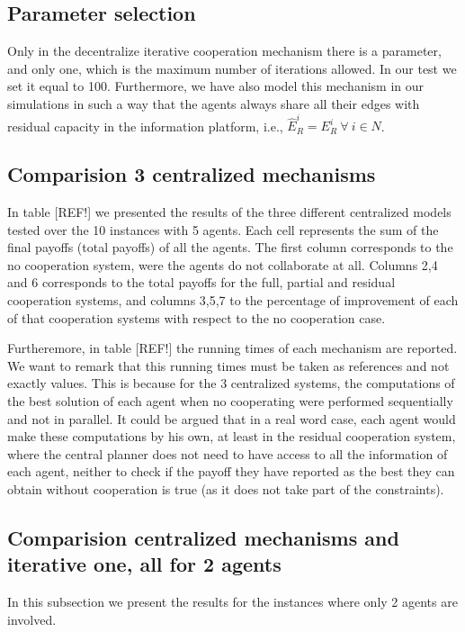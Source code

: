 \documentclass[review]{elsarticle}
\begin{document}
\subsection{Parameter selection}

Only in the decentralize iterative cooperation mechanism there is a parameter, and only one, which is the maximum number of iterations allowed. In our test we set it equal to 100. Furthermore, we have also model this mechanism in our simulations in such a way that the agents always share all their edges with residual capacity in the information platform, i.e., $\widehat{E}_R^i=E_R^i\ \forall\ i\in N$.

\subsection{Comparision 3 centralized mechanisms}

In table [REF!] we presented the results of the three different centralized models tested over the 10 instances with 5 agents. Each cell represents the sum of the final payoffs (total payoffs) of all the agents. The first column corresponds to the no cooperation system, were the agents do not collaborate at all. Columns 2,4 and 6 corresponds to the total payoffs for the full, partial and residual cooperation systems, and columns 3,5,7 to the percentage of improvement of each of that cooperation systems with respect to the no cooperation case.

Furtheremore, in table [REF!] the running times of each mechanism are reported. We want to remark that this running times must be taken as references and not exactly values. This is because for the 3 centralized systems, the computations of the best solution of each agent when no cooperating were performed sequentially and not in parallel. It could be argued that in a real word case, each agent would make these computations by his own, at least in the residual cooperation system, where the central planner does not need to have access to all the information of each agent, neither to check if the payoff they have reported as the best they can obtain without cooperation is true (as it does not take part of the constraints).

\subsection{Comparision centralized mechanisms and iterative one, all for 2 agents}
 

In this subsection we present the results for the instances where only 2 agents are involved. 
\end{document}
